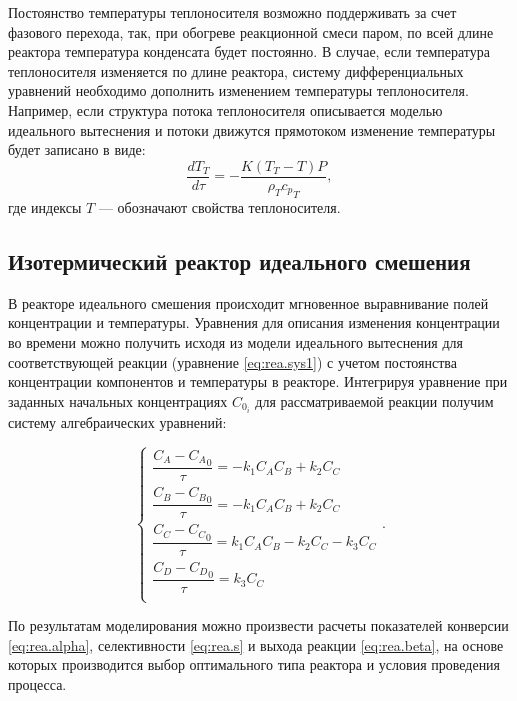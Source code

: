 Постоянство температуры теплоносителя возможно поддерживать за счет фазового перехода, так, при обогреве реакционной смеси паром, по всей длине реактора температура конденсата будет постоянно. В случае, если температура теплоносителя изменяется по длине реактора, систему дифференциальных уравнений необходимо дополнить изменением температуры теплоносителя. Например, если структура потока теплоносителя описывается моделью идеального вытеснения и потоки движутся прямотоком изменение температуры будет записано в виде:
\begin{equation}
	\dfrac{d T_T}{d \tau} = -\dfrac{K(T_T-T)P}{\rho_T {c_p}_T},
\end{equation}
где индексы $T$ --- обозначают свойства теплоносителя.


\subsection*{Изотермический реактор идеального смешения}
В реакторе идеального смешения происходит мгновенное выравнивание полей концентрации и температуры. Уравнения для описания изменения концентрации во времени можно получить исходя из модели идеального вытеснения для соответствующей реакции (уравнение \eqref{eq:rea.sys1}) с учетом постоянства концентрации компонентов и температуры в реакторе. Интегрируя уравнение при заданных начальных концентрациях  $C_{0_i}$  для рассматриваемой реакции получим систему алгебраических уравнений:

\begin{equation}\label{eq:rea.syssmis}
\left\lbrace 
\begin{gathered} 
\dfrac{C_A - {C_A}_0} {\tau} = -k_1 C_A C_B +k_2 C_C \\
\dfrac{C_B - {C_B}_0} {\tau} = -k_1 C_A C_B +k_2 C_C \\
\dfrac{C_C - {C_C}_0} {\tau} = k_1 C_A C_B -k_2 C_C - k_3 C_C \\
\dfrac{C_D - {C_D}_0} {\tau} = k_3 C_C \\
\end{gathered} 
\right. .
\end{equation}

По результатам моделирования можно произвести расчеты показателей конверсии \eqref{eq:rea.alpha}, селективности \eqref{eq:rea.s} и выхода реакции \eqref{eq:rea.beta}, на основе которых производится выбор оптимального типа реактора и условия проведения процесса. 




